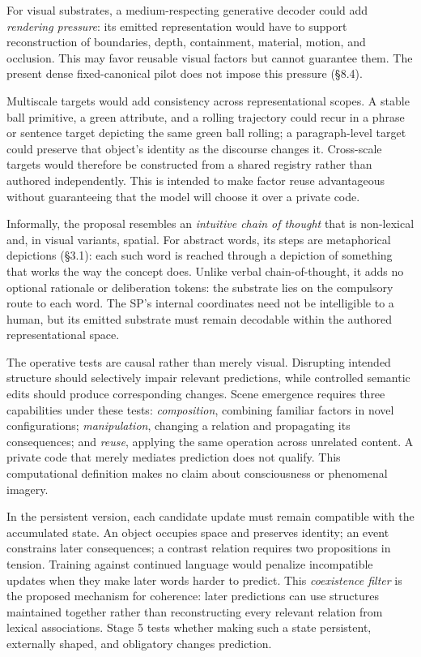 \documentclass[11pt,a4paper]{article}
\begin{document}
For visual substrates, a medium-respecting generative decoder could add \emph{rendering pressure}: its emitted representation would have to support reconstruction of boundaries, depth, containment, material, motion, and occlusion. This may favor reusable visual factors but cannot guarantee them. The present dense fixed-canonical pilot does not impose this pressure (§8.4).

Multiscale targets would add consistency across representational scopes. A stable ball primitive, a green attribute, and a rolling trajectory could recur in a phrase or sentence target depicting the same green ball rolling; a paragraph-level target could preserve that object's identity as the discourse changes it. Cross-scale targets would therefore be constructed from a shared registry rather than authored independently. This is intended to make factor reuse advantageous without guaranteeing that the model will choose it over a private code.

Informally, the proposal resembles an \emph{intuitive chain of thought} that is non-lexical and, in visual variants, spatial. For abstract words, its steps are metaphorical depictions (§3.1): each such word is reached through a depiction of something that works the way the concept does. Unlike verbal chain-of-thought, it adds no optional rationale or deliberation tokens: the substrate lies on the compulsory route to each word. The SP's internal coordinates need not be intelligible to a human, but its emitted substrate must remain decodable within the authored representational space.

The operative tests are causal rather than merely visual. Disrupting intended structure should selectively impair relevant predictions, while controlled semantic edits should produce corresponding changes. Scene emergence requires three capabilities under these tests: \emph{composition}, combining familiar factors in novel configurations; \emph{manipulation}, changing a relation and propagating its consequences; and \emph{reuse}, applying the same operation across unrelated content. A private code that merely mediates prediction does not qualify. This computational definition makes no claim about consciousness or phenomenal imagery.

In the persistent version, each candidate update must remain compatible with the accumulated state. An object occupies space and preserves identity; an event constrains later consequences; a contrast relation requires two propositions in tension. Training against continued language would penalize incompatible updates when they make later words harder to predict. This \emph{coexistence filter} is the proposed mechanism for coherence: later predictions can use structures maintained together rather than reconstructing every relevant relation from lexical associations. Stage 5 tests whether making such a state persistent, externally shaped, and obligatory changes prediction.
\end{document}
